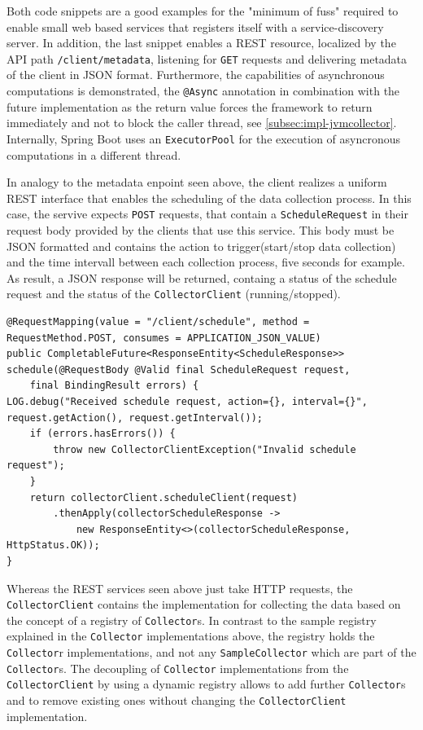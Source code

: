 Both code snippets are a good examples for the "minimum of fuss" required to enable small web based services that registers itself
with a service-discovery server. In addition, the last snippet enables a REST resource, localized by the API
path \verb|/client/metadata|, listening for \verb|GET| requests and delivering metadata of the client in JSON format. Furthermore, the capabilities
of asynchronous computations is demonstrated, the \verb|@Async| annotation in combination with the future implementation as the return
value forces the framework to return immediately and not to block the caller thread, see \autoref{subsec:impl-jvmcollector}. Internally,
Spring Boot uses an \verb|ExecutorPool| for the execution of asyncronous computations in a different thread.

In analogy to the metadata enpoint seen above, the client realizes a uniform REST interface that enables the scheduling
of the data collection process. In this case, the servive expects \verb|POST| requests, that contain a \verb|ScheduleRequest| in their
request body provided by the clients that use this service. This body must be JSON formatted and contains the action to
trigger(start/stop data collection) and the time intervall between each collection process, five seconds for example. As result,
a JSON response will be returned, containg a status of the schedule request and the status of the \verb|CollectorClient| (running/stopped).

\begin{lstlisting}[caption={"ScheduleController", REST endpoint}, captionpos=b, label={lst:schedule-endpoint}]
@RequestMapping(value = "/client/schedule", method = RequestMethod.POST, consumes = APPLICATION_JSON_VALUE)
public CompletableFuture<ResponseEntity<ScheduleResponse>> schedule(@RequestBody @Valid final ScheduleRequest request,
    final BindingResult errors) {
LOG.debug("Received schedule request, action={}, interval={}", request.getAction(), request.getInterval());
    if (errors.hasErrors()) {
        throw new CollectorClientException("Invalid schedule request");
    }
    return collectorClient.scheduleClient(request)
        .thenApply(collectorScheduleResponse ->
            new ResponseEntity<>(collectorScheduleResponse, HttpStatus.OK));
}
\end{lstlisting}

Whereas the REST services seen above just take HTTP requests, the \verb|CollectorClient| contains the implementation for
collecting the data based on the concept of a registry of \verb|Collector|s. In contrast to the sample registry explained in the
\verb|Collector| implementations above, the registry holds the \verb|Collector|r implementations, and not any \verb|SampleCollector| which
are part of the \verb|Collector|s. The decoupling of \verb|Collector| implementations from the \verb|CollectorClient| by using a dynamic registry
allows to add further \verb|Collector|s and to remove existing ones without changing the \verb|CollectorClient| implementation.

